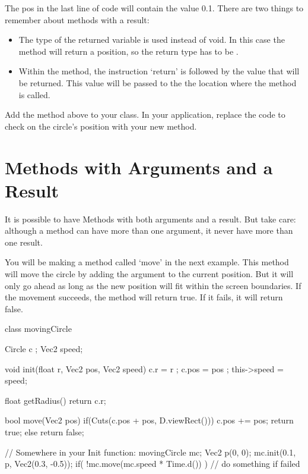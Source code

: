 The  pos in the last line of code will contain the value 0.1. There are two things to remember about methods with a result:

\begin{itemize}
\item The type of the returned variable is used instead of void. In this case the method will return a position, so the return type has to be .
\item Within the method, the instruction `return' is followed by the value that will be returned. This value will be passed to the the location where the method is called.
\end{itemize}

\begin{exercise}
Add the method above to your class. In your application, replace the code to check on the circle's position with your new method.
\end{exercise}

\section{Methods with Arguments and a Result}
It is possible to have Methods with both arguments and a result. But take care: although a method can have more than one argument, it never have more than one result.

You will be making a method called `move' in the next example. This method will move the circle by adding the argument to the current position. But it will only go ahead as long as the new position will fit within the screen boundaries. If the movement succeeds, the method will return true. If it fails, it will return false.

\begin{code}
class movingCircle {
  Circle c    ;
  Vec2   speed;
  
  void init(float r, Vec2 pos, Vec2 speed) {
    c.r         = r    ;
    c.pos       = pos  ;
    this->speed = speed;
  }
  
  float getRadius() {
    return c.r;
  }
  
  bool move(Vec2 pos) {
    if(Cuts(c.pos + pos, D.viewRect())) {
      c.pos += pos;
      return true;
    } else {
      return false;
    }
  }
}

// Somewhere in your Init function:
movingCircle mc;
Vec2 p(0, 0);
mc.init(0.1, p, Vec2(0.3, -0.5));
if( !mc.move(mc.speed * Time.d()) ) {
  // do something if failed
}
\end{code}


